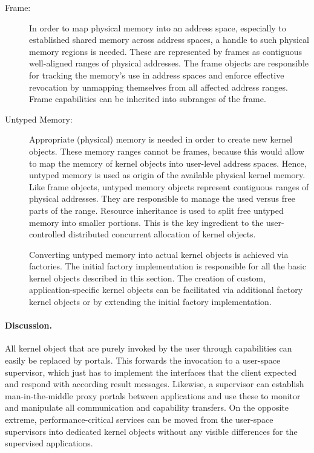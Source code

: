 \begin{description}
\item[Frame:] In order to map physical memory into an address space, especially to established shared memory across address spaces, a handle to such physical memory regions is needed. These are represented by frames as contiguous well-aligned ranges of physical addresses. The frame objects are responsible for tracking the memory's use in address spaces and enforce effective revocation by unmapping themselves from all affected address ranges. Frame capabilities can be inherited into subranges of the frame.

\item[Untyped Memory:]
Appropriate (physical) memory is needed in order to create new kernel objects. These memory ranges cannot be frames, because this would allow to map the memory of kernel objects into user-level address spaces. Hence, untyped memory is used as origin of the available physical kernel memory. Like frame objects, untyped memory objects represent contiguous ranges of physical addresses. They are responsible to manage the used versus free parts of the range. Resource inheritance is used to split free untyped memory into smaller portions. This is the key ingredient to the user-controlled distributed concurrent allocation of kernel objects. 

Converting untyped memory into actual kernel objects is achieved via factories. The initial factory implementation is responsible for all the basic kernel objects described in this section. The creation of custom, application-specific kernel objects can be facilitated via additional factory kernel objects or by extending the initial factory implementation.
\end{description}

\paragraph{Discussion.}
All kernel object that are purely invoked by the user through capabilities can easily be replaced by portals. This forwards the invocation to a user-space supervisor, which just has to implement the interfaces that the client expected and respond with according result messages. Likewise, a supervisor can establish man-in-the-middle proxy portals between applications and use these to monitor and manipulate all communication and capability transfers. On the opposite extreme, performance-critical services can be moved from the user-space supervisors into dedicated kernel objects without any visible differences for the supervised applications.

